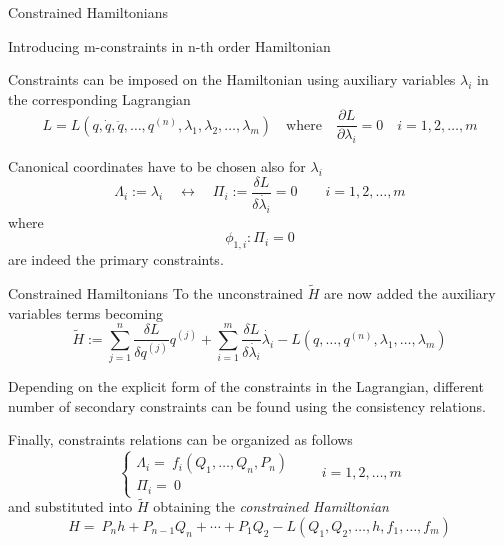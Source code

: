 \begin{frame}{Constrained Hamiltonians}
  \begin{alertblock}{Introducing m-constraints in n-th order Hamiltonian}
  \end{alertblock}
  Constraints can be imposed on the Hamiltonian using
  auxiliary variables $\lambda_i$ in the corresponding Lagrangian
  \begin{equation*}
    L = L(q, \dot{q}, \ddot{q}, \ldots, q^{(n)},
      \lambda_1, \lambda_2, \ldots, \lambda_m)
    \quad \text{where} \quad
    \frac{\partial L}{\partial \lambda_i} = 0 \quad i=1, 2, \ldots, m
  \end{equation*}

  Canonical coordinates have to be chosen also for $\lambda_i$
  \begin{equation*} \label{eq:def_canonical_coordinates_lambda}
    \Lambda_{i}:= \lambda_{i}
    \quad \leftrightarrow \quad
    \Pi_{i} := \frac{\delta L}{\delta \dot{\lambda_{i}}} = 0
    \qquad i = 1, 2, \ldots, m
  \end{equation*}
  where
  \begin{equation*}
    \phi_{1, i}: \Pi_i = 0
  \end{equation*}
  are indeed the primary constraints.
\end{frame}

\begin{frame}{Constrained Hamiltonians}
  To the unconstrained $\tilde{H}$ are now added the auxiliary
  variables terms becoming
  \begin{equation*}
    \tilde{H} :=
    \sum_{j=1}^{n} \frac{\delta L}{\delta q^{(j)}} q^{(j)} +
    \sum_{i=1}^{m} \frac{\delta L}{\delta \dot{\lambda_i}} \dot{\lambda_i} -
    L(q, \ldots, q^{(n)}, \lambda_1, \ldots, \lambda_m)
  \end{equation*}

  Depending on the explicit form of the constraints in the Lagrangian,
  different number of secondary constraints can be found using the consistency
  relations.

  Finally, constraints relations can be organized as follows
  \begin{equation*}
    \begin{cases}
      \Lambda_i =\ f_i(Q_1, \ldots, Q_n, P_n) \\
      \Pi_i =\ 0
    \end{cases}
    \qquad i = 1, 2, \ldots, m
  \end{equation*}
  and substituted into $\tilde{H}$ obtaining the \emph{constrained
  Hamiltonian}
  \begin{equation*}
    H =\ P_n h + P_{n-1} Q_n + \cdots + P_1 Q_2
       - L ( Q_1, Q_2, \ldots, h, f_1, \ldots, f_m)
  \end{equation*}
\end{frame}
